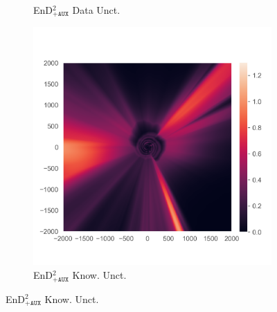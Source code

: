 \begin{figure}
\begin{subfigure}{0.22\textwidth}
  \caption{EnD$^2_{\texttt{+AUX}}$ Data Unct.}
  \label{fig:3h}
\end{subfigure}%
\begin{subfigure}{0.22\textwidth}
  \centering
  \includegraphics[trim=42 45 15 55, clip, width=\linewidth]{../openreview/plots/3i.png}
  \caption{EnD$^2_{\texttt{+AUX}}$ Know. Unct.}
  \label{fig:3i}
\end{subfigure}%


\end{figure}
